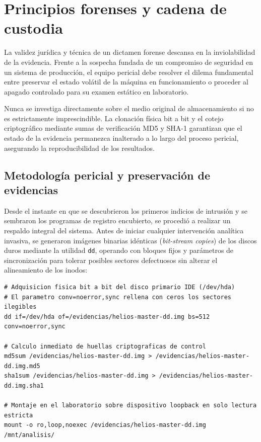 \chapter{Principios forenses y cadena de custodia}

La validez jurídica y técnica de un dictamen forense descansa en la inviolabilidad de la evidencia. Frente a la sospecha fundada de un compromiso de seguridad en un sistema de producción, el equipo pericial debe resolver el dilema fundamental entre preservar el estado volátil de la máquina en funcionamiento o proceder al apagado controlado para su examen estático en laboratorio.

\begin{notaforense}
Nunca se investiga directamente sobre el medio original de almacenamiento si no es estrictamente imprescindible. La clonación física bit a bit y el cotejo criptográfico mediante sumas de verificación MD5 y SHA-1 garantizan que el estado de la evidencia permanezca inalterado a lo largo del proceso pericial, asegurando la reproducibilidad de los resultados.
\end{notaforense}

\section{Metodología pericial y preservación de evidencias}

Desde el instante en que se descubrieron los primeros indicios de intrusión y se sembraron los programas de registro encubierto, se procedió a realizar un respaldo integral del sistema. Antes de iniciar cualquier intervención analítica invasiva, se generaron imágenes binarias idénticas (\textit{bit-stream copies}) de los discos duros mediante la utilidad \texttt{dd}, operando con bloques fijos y parámetros de sincronización para tolerar posibles sectores defectuosos sin alterar el alineamiento de los inodos:

\begin{lstlisting}[style=terminal]
# Adquisicion fisica bit a bit del disco primario IDE (/dev/hda)
# El parametro conv=noerror,sync rellena con ceros los sectores ilegibles
dd if=/dev/hda of=/evidencias/helios-master-dd.img bs=512 conv=noerror,sync

# Calculo inmediato de huellas criptograficas de control
md5sum /evidencias/helios-master-dd.img > /evidencias/helios-master-dd.img.md5
sha1sum /evidencias/helios-master-dd.img > /evidencias/helios-master-dd.img.sha1

# Montaje en el laboratorio sobre dispositivo loopback en solo lectura estricta
mount -o ro,loop,noexec /evidencias/helios-master-dd.img /mnt/analisis/
\end{lstlisting}

